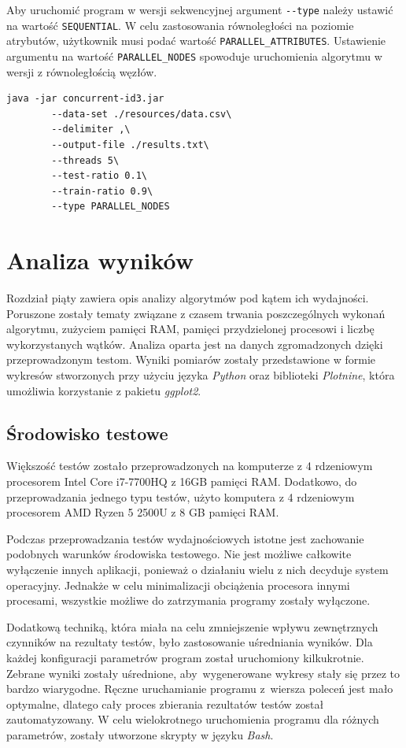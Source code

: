 \documentclass[12pt]{article}
\begin{document}
Aby uruchomić program w wersji sekwencyjnej argument \verb|--type| należy ustawić na wartość \verb|SEQUENTIAL|.
W celu zastosowania równoległości na poziomie atrybutów, użytkownik musi podać wartość \verb|PARALLEL_ATTRIBUTES|.
Ustawienie argumentu na wartość \verb|PARALLEL_NODES| spowoduje uruchomienia algorytmu w wersji z równoległością węzłów.

\begin{lstlisting}[caption=Przykładowe uruchomienie programu,frame=single]
    java -jar concurrent-id3.jar
        --data-set ./resources/data.csv\
        --delimiter ,\
        --output-file ./results.txt\
        --threads 5\
        --test-ratio 0.1\
        --train-ratio 0.9\
        --type PARALLEL_NODES
\end{lstlisting}

\newpage
\section{Analiza wyników}

Rozdział piąty zawiera opis analizy algorytmów pod kątem ich wydajności. Poruszone zostały
tematy związane z czasem trwania poszczególnych wykonań algorytmu, zużyciem pamięci RAM, pamięci
przydzielonej procesowi i liczbę wykorzystanych wątków. Analiza oparta jest na danych zgromadzonych
dzięki przeprowadzonym testom. Wyniki pomiarów zostały przedstawione w formie
wykresów stworzonych przy użyciu języka \textit{Python} oraz biblioteki \textit{Plotnine}, która umożliwia
korzystanie z pakietu \textit{ggplot2}.

\subsection{Środowisko testowe}
Większość testów zostało przeprowadzonych na komputerze z 4 rdzeniowym procesorem Intel Core i7-7700HQ
z 16GB pamięci RAM. Dodatkowo, do przeprowadzania jednego typu testów, użyto komputera z 4 rdzeniowym procesorem AMD
Ryzen 5 2500U z 8 GB pamięci RAM.

Podczas przeprowadzania testów wydajnościowych istotne jest zachowanie podobnych warunków środowiska testowego.
Nie jest możliwe całkowite wyłączenie innych aplikacji, ponieważ o działaniu wielu z nich decyduje
system operacyjny. Jednakże w celu minimalizacji obciążenia procesora innymi procesami, wszystkie możliwe
do zatrzymania programy zostały wyłączone.

Dodatkową techniką, która miała na celu zmniejszenie wpływu zewnętrznych czynników na rezultaty testów,
było zastosowanie uśredniania wyników. Dla każdej konfiguracji parametrów program został uruchomiony kilkukrotnie.
Zebrane wyniki zostały uśrednione, aby~wygenerowane wykresy stały się przez to bardzo wiarygodne.
Ręczne uruchamianie programu z~wiersza poleceń jest mało optymalne, dlatego cały proces zbierania rezultatów testów
został zautomatyzowany. W celu wielokrotnego uruchomienia programu dla różnych parametrów, zostały utworzone
skrypty w języku \textit{Bash}.
\end{document}

